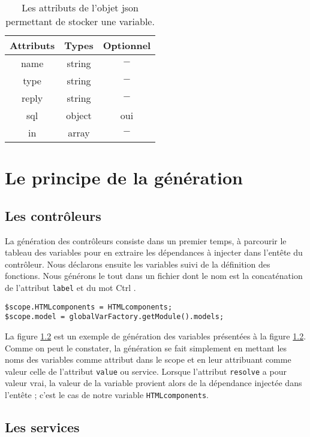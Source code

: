 \documentclass[a4paper,11pt]{report}
\begin{document}
 \begin{table}[ht]
 \begin{tabular}{|c|c|c|}
   \hline
   Attributs & Types & Optionnel \\
   \hline
   name  & string &  $-$ \\
   \hline
   type  & string &  $-$ \\
    \hline
   reply  & string &  $-$ \\
    \hline
      sql  & object &  oui \\
    \hline
      in  & array &  $-$ \\
    \hline
  \end{tabular}
 \caption{Les attributs de l'objet  json permettant de stocker une variable. \label{si:res} }
\end{table} 


\section{Le principe de la génération}

\subsection{Les contrôleurs}

La génération des contrôleurs consiste dans un premier temps, à parcourir le tableau des variables pour en extraire les
dépendances  à injecter dans l'entête du contrôleur. Nous déclarons ensuite les variables suivi de la définition des fonctions.
Nous générons le tout dans un fichier dont le nom est la concaténation de l'attribut {\tt label} et du mot \og Ctrl \fg .


\begin{verbatim}
$scope.HTMLcomponents = HTMLcomponents;
$scope.model = globalVarFactory.getModule().models;
\end{verbatim}

La figure \ref{} est un exemple de génération des variables présentées à la figure \ref{}.
Comme on peut le constater, la génération se fait simplement en mettant les noms des variables comme attribut dans le scope 
et en leur attribuant comme valeur celle de l'attribut {\tt value} ou service.   Lorsque l'attribut {\tt resolve} a pour valeur vrai, la 
valeur de la variable  provient alors de la  dépendance injectée dans l'entête ; c'est le cas de notre variable {\tt HTMLcomponents}.

\subsection{Les services}
\end{document}
